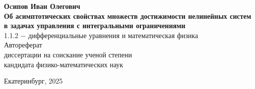\documentclass[../abstract.tex]{subfiles}
\begin{document}
\begin{titlepage}
 \begin{center}
 \vspace*{3cm}
 {\textbf{Оcипов Иван Олегович}}\\
 \vspace*{1cm}
 {\textbf{Об асимптотических свойствах множеств достижимости нелинейных систем в задачах управления с интегральными ограничениями}}\\
 \vspace*{2cm}
 {1.1.2 $-$ дифференциальные уравнения и математическая физика}\\
 \vspace*{1cm}
 {Автореферат \\ диссертации на соискание ученой степени \\
 кандидата физико-математических наук}\\
 \end{center}
 
 \vspace*{\fill}
 \begin{center}
 {Екатеринбург, 2025}
 \end{center}
\end{titlepage}
\end{document}
